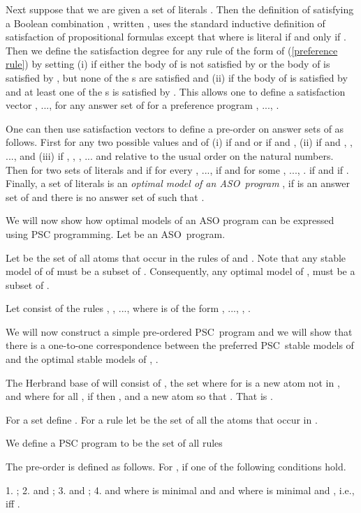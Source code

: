 \documentclass[letterpaper]{article}\usepackage{aaai}
\begin{document}
Next suppose that we are given a set of literals . Then the definition of
 satisfying a Boolean combination , written , uses the
standard inductive definition of satisfaction of propositional formulas except
that   where  is literal if and only if . Then
we define the satisfaction degree  for any rule of
the form of (\ref{preference rule}) by setting (i) 
if either the body of  is not satisfied by  or the body of  is
satisfied by , but none of the s are satisfied and (ii)
  if the body of  is
satisfied by  and at least one of the s is satisfied by . This
allows one to define a satisfaction vector , ...,  for any answer set  of  for
a preference program , ..., .

One can then use satisfaction vectors to define a pre-order on answer sets of
 as follows. First for any two possible values  and  of
 (i)  if  and  or if  and
, (ii)  if  and   , , ..., and (iii) 
if ,   , , ... and  relative to the usual order on
the natural numbers. Then for two sets of literals  and 
 if  for every , ...,  
if  and for some , ...,    .  if  and  if . Finally, a set of literals  is an \emph{optimal model of an
ASO\ program} ,  if  is an answer set of  and
there is no answer set  of  such that .

We will now show how optimal models of an ASO program can be expressed using
PSC programming. Let  be an
ASO\ program.


Let  be the set of all atoms that occur in the rules of  and
. Note that any stable model of  of  must be a subset of
. Consequently, any optimal model of ,  must be a
subset of .

Let  consist of the rules , , ...,  where
 is of the form , ...,
,  .

We will now construct a simple pre-ordered PSC\ program  and we will show
that there is a one-to-one correspondence between the preferred PSC\ stable
models of  and the optimal stable models of , .

The Herbrand base  of  will consist of , the set
  where for  
is a new atom not in , and where for all ,  if  then
, and a new atom  so that . That is .

For a set  define  .
For a rule  let  be the set of
all the atoms that occur in .

We define a PSC program  to be the set of all rules

The pre-order  is defined as follows. For ,
  if one of the following
conditions hold.

1. ; 2.  and ; 3.  and ; 4.  and  where  is minimal and  and  where  is minimal and
, i.e.,  iff .
\end{document}
